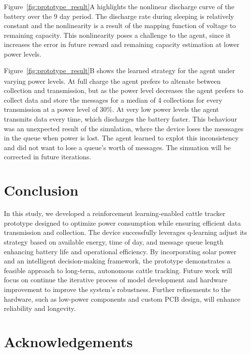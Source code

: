 \documentclass[10pt]{cai}
\begin{document}
Figure~\ref{fig:prototype_result}A highlights the nonlinear discharge curve of the battery over the 9 day period. 
The discharge rate during sleeping is relatively constant and the nonlinearity is a result of the mapping function of voltage to remaining capacity.
This nonlinearity poses a challenge to the agent, since it increases the error in future reward and remaining capacity estimation at lower power levels.

Figure~\ref{fig:prototype_result}\textsubscript{}B shows the learned strategy for the agent under varying power levels.
At full charge the agent prefers to altenate between collection and transmission, but as the power level decreases the agent prefers to collect data and store the messages for a median of 4 collections for every transmission at a power level of 30\%.
At very low power levels the agent transmits data every time, which discharges the battery faster.
This behaviour was an unexpected result of the simulation, where the device loses the messsages in the queue when power is lost.
The agent learned to explot this inconsistency and did not want to lose a queue's worth of messages.
The simuation will be corrected in future iterations.

\section{Conclusion}
In this study, we developed a reinforcement learning-enabled cattle tracker prototype designed to optimize power consumption while ensuring efficient data transmission and collection.
The device successfully leverages q-learning adjust its strategy based on available energy, time of day, and message queue length enhancing battery life and operational efficiency.
By incorporating solar power and an intelligent decision-making framework, the prototype demonstrates a feasible approach to long-term, autonomous cattle tracking.
Future work will focus on continue the iterative process of model development and hardware improvement to improve the system's robustness.
Further refinements to the hardware, such as low-power components and custom PCB design, will enhance reliability and longevity. 

\section*{Acknowledgements}

\printbibliography[heading=subbibintoc]
\end{document}
